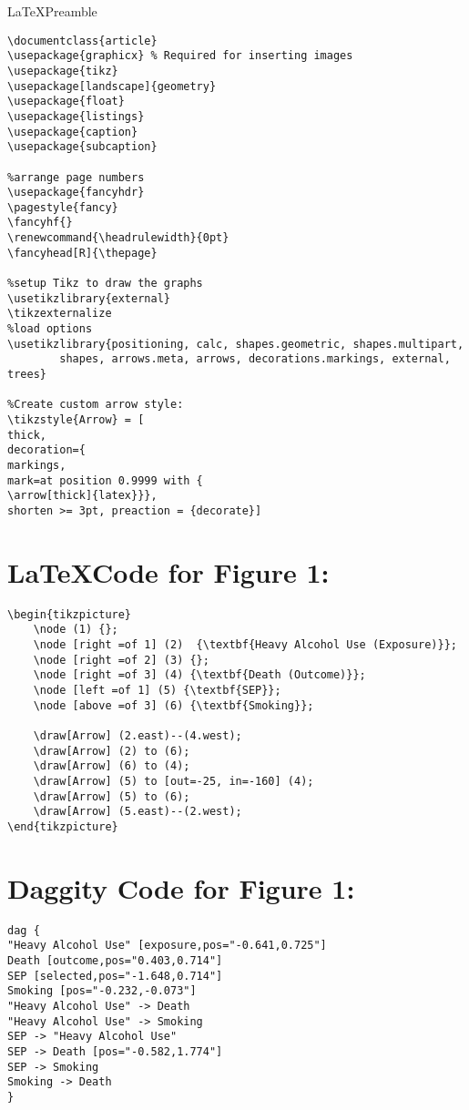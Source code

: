 \documentclass{article}
\renewcommand{\headrulewidth}{0pt}
\begin{document}
\huge \LaTeX \hspace*{5mm }Preamble
\normalsize
\begin{lstlisting}[frame=single, basicstyle=\ttfamily]
    \documentclass{article}
\usepackage{graphicx} % Required for inserting images
\usepackage{tikz}
\usepackage[landscape]{geometry}
\usepackage{float}
\usepackage{listings}
\usepackage{caption}
\usepackage{subcaption}

%arrange page numbers
\usepackage{fancyhdr}
\pagestyle{fancy}
\fancyhf{}
\renewcommand{\headrulewidth}{0pt}
\fancyhead[R]{\thepage}

%setup Tikz to draw the graphs
\usetikzlibrary{external}
\tikzexternalize 
%load options
\usetikzlibrary{positioning, calc, shapes.geometric, shapes.multipart,
        shapes, arrows.meta, arrows, decorations.markings, external, trees}

%Create custom arrow style:
\tikzstyle{Arrow} = [
thick,
decoration={
markings,
mark=at position 0.9999 with {
\arrow[thick]{latex}}},
shorten >= 3pt, preaction = {decorate}]
\end{lstlisting}



\section*{\LaTeX Code for Figure 1:}
\begin{lstlisting}[frame=single, basicstyle=\ttfamily, linewidth=20.5cm]
\begin{tikzpicture}
    \node (1) {};
    \node [right =of 1] (2)  {\textbf{Heavy Alcohol Use (Exposure)}};
    \node [right =of 2] (3) {};
    \node [right =of 3] (4) {\textbf{Death (Outcome)}};
    \node [left =of 1] (5) {\textbf{SEP}};
    \node [above =of 3] (6) {\textbf{Smoking}};

    \draw[Arrow] (2.east)--(4.west);
    \draw[Arrow] (2) to (6);
    \draw[Arrow] (6) to (4);
    \draw[Arrow] (5) to [out=-25, in=-160] (4);
    \draw[Arrow] (5) to (6);
    \draw[Arrow] (5.east)--(2.west);
\end{tikzpicture}
\end{lstlisting}

\section*{Daggity Code for Figure 1:}
\begin{lstlisting}[frame=single, basicstyle=\ttfamily]
    dag {
"Heavy Alcohol Use" [exposure,pos="-0.641,0.725"]
Death [outcome,pos="0.403,0.714"]
SEP [selected,pos="-1.648,0.714"]
Smoking [pos="-0.232,-0.073"]
"Heavy Alcohol Use" -> Death
"Heavy Alcohol Use" -> Smoking
SEP -> "Heavy Alcohol Use"
SEP -> Death [pos="-0.582,1.774"]
SEP -> Smoking
Smoking -> Death
}
\end{lstlisting}
    
\end{document}
